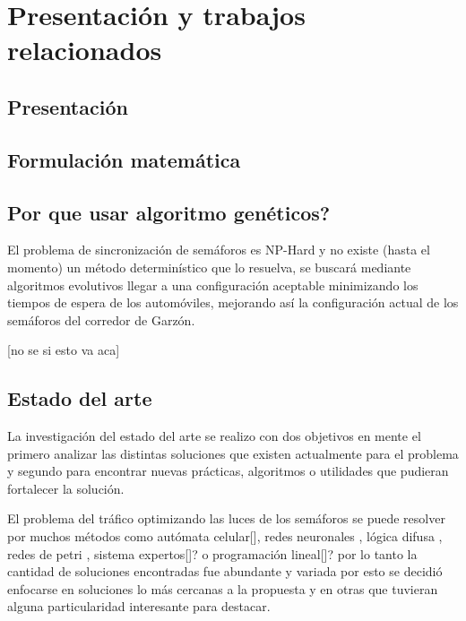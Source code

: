 \chapter{Presentación y trabajos relacionados}

\section{Presentación}
\section{Formulación matemática}

\section{Por que usar algoritmo genéticos?}
El problema de sincronización de semáforos es NP-Hard y 
no existe (hasta el momento) un método determinístico que lo
resuelva, se buscará mediante algoritmos evolutivos llegar a
una configuración aceptable minimizando los tiempos de
espera de los automóviles, mejorando así la configuración
actual de los semáforos del corredor de Garzón.

[no se si esto va aca]

\section{Estado del arte}
La investigación del estado del arte se realizo con dos objetivos en mente el primero analizar las distintas soluciones que existen actualmente para el problema y segundo para encontrar nuevas prácticas, algoritmos o utilidades que pudieran fortalecer la solución.

El problema del tráfico optimizando las luces de los semáforos se puede resolver por muchos métodos como autómata celular[], redes neuronales \citep{Lopez1999}, lógica difusa \citep{Lim2001}, redes de petri \citep{DiFebbraro2002}, sistema expertos[]? o programación lineal[]? por lo tanto la cantidad de soluciones encontradas fue abundante y variada por esto se decidió enfocarse en soluciones lo más cercanas a la propuesta y en otras que tuvieran alguna particularidad interesante para destacar.


